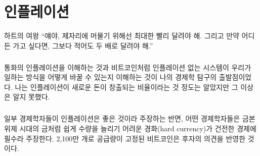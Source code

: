 \chapter{인플레이션}
\label{les:9}

\begin{chapquote}{하트의 여왕} 
	\enquote{얘야, 제자리에 머물기 위해선 최대한 빨리 달려야 해. 그리고 만약 어디든 가고 싶다면, 그보다 적어도 두 배로 달려야 해.}
\end{chapquote}

\paragraph{}
통화의 인플레이션을 이해하는 것과
비트코인처럼 인플레이션 없는 시스템이 우리가 일하는 방식을 어떻게 바꿀 수 있는지 이해하는 것이 나의 경제학 탐구의 출발점이었다. 
나는 인플레이션이 새로운 돈이 창출되는 비율이라는 것 정도는 알았지만 그 이상은 알지 못했다.

\paragraph{}
일부 경제학자들이 인플레이션은 좋은 것이라 주장하는 반면, 어떤 경제학자들은 금본위제 시대의 금처럼 
쉽게 수량을 늘리기 어려운 경화(hard currency)가 건전한 경제에 필수라 주장한다. 
2,100만 개로 공급량이 고정된 비트코인은 후자의 의견을 반영한 것이다.

